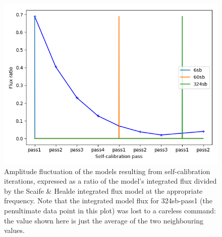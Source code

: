 \begin{figure}[h!]
\includegraphics[width=0.8\linewidth]{images/AmpFluct.png}
\caption{\label{fig.SC.ampfluct} Amplitude fluctuation of the models resulting from self-calibration iterations, expressed as a ratio of the model's integrated flux divided by the Scaife \& Healde integrated flux model at the appropriate frequency. Note that the integrated model flux for 324sb-pass1 (the penultimate data point in this plot) was lost to a careless command: the value shown here is just the average of the two neighbouring values.}
\end{figure}

